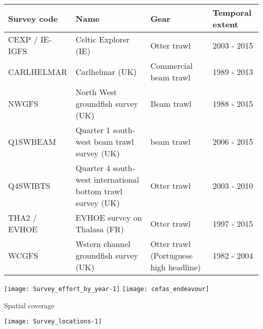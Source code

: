 \documentclass[xcolor=x11names,compress]{beamer}
\renewcommand{\(}{\begin{columns}}
\renewcommand{\)}{\end{columns}}
\newcommand{\<}[1]{\begin{column}{#1}}
\renewcommand{\>}{\end{column}}
\begin{document}
\begin{frame}

\begin{table}[!htb]
	\tiny
	\center
	\begin{tabular}{ p{1.5cm} p{3cm} p{2cm} p{1.5cm} }
		\hline
		Survey code    & Name 	& Gear & Temporal extent \\
		\hline
		CEXP / IE-IGFS & Celtic Explorer (IE)   & Otter trawl & 2003 - 2015 \\
		CARLHELMAR     & Carlhelmar (UK)	& Commercial beam trawl & 1989 - 2013 \\
		NWGFS          & North West groundfish survey (UK) & Beam trawl & 1988 - 2015 \\
		Q1SWBEAM       & Quarter 1 south-west beam trawl survey (UK) 	& beam trawl & 2006 - 2015 \\
		Q4SWIBTS       & Quarter 4 south-west international bottom trawl survey (UK) & Otter trawl & 2003 - 2010 \\
		THA2 / EVHOE    & EVHOE survey on Thalasa (FR) & Otter trawl & 1997 - 2015 \\
		WCGFS          & Wstern channel groundfish survey (UK) & Otter
		trawl (Portuguese high headline) & 1982 - 2004 \\
		\hline
	\end{tabular}
	
\end{table}

\texttt{[image: Survey\_effort\_by\_year-1]}
\texttt{[image: cefas\_endeavour]}

\end{frame}

\begin{frame}{Spatial coverage}

\centering
\texttt{[image: Survey\_locations-1]}

\end{frame}
\end{document}
